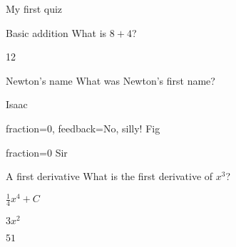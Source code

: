 \documentclass[12pt]{article}
\begin{document}
\begin{quiz}{My first quiz}

\begin{numerical}[points=2]{Basic addition}
What is $8 + 4$?
\item 12
\end{numerical}

\begin{shortanswer}[case sensitive=true]{Newton’s name}
What was Newton’s first name?
\item Isaac
\item[fraction=0, feedback={No, silly!}] Fig
\item{fraction=0} Sir
\end{shortanswer}

\begin{multi}[points=3]{A first derivative}
What is the first derivative of $x^3$?
\item $\frac{1}{4} x^4+C$
\item* $3x^2$
\item $51$
\end{multi}

\end{quiz}
\end{document}

